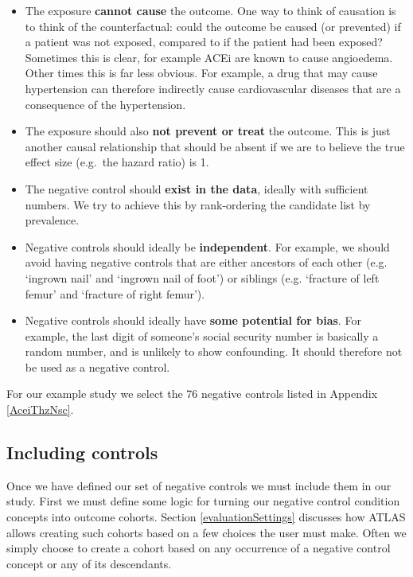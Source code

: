 \documentclass[11pt]{book}
\providecommand{\tightlist}{%
  \setlength{\itemsep}{0pt}\setlength{\parskip}{0pt}}
\begin{document}
\begin{itemize}
\tightlist
\item
  The exposure \textbf{cannot cause} the outcome. One way to think of
  causation is to think of the counterfactual: could the outcome be
  caused (or prevented) if a patient was not exposed, compared to if the
  patient had been exposed? Sometimes this is clear, for example ACEi
  are known to cause angioedema. Other times this is far less obvious.
  For example, a drug that may cause hypertension can therefore
  indirectly cause cardiovascular diseases that are a consequence of the
  hypertension.
\item
  The exposure should also \textbf{not prevent or treat} the outcome.
  This is just another causal relationship that should be absent if we
  are to believe the true effect size (e.g.~the hazard ratio) is 1.
\item
  The negative control should \textbf{exist in the data}, ideally with
  sufficient numbers. We try to achieve this by rank-ordering the
  candidate list by prevalence.
\item
  Negative controls should ideally be \textbf{independent}. For example,
  we should avoid having negative controls that are either ancestors of
  each other (e.g. `ingrown nail' and `ingrown nail of foot') or
  siblings (e.g. `fracture of left femur' and `fracture of right
  femur').
\item
  Negative controls should ideally have \textbf{some potential for
  bias}. For example, the last digit of someone's social security number
  is basically a random number, and is unlikely to show confounding. It
  should therefore not be used as a negative control.
\end{itemize}

For our example study we select the 76 negative controls listed in
Appendix \ref{AceiThzNsc}.

\subsection{Including controls}\label{including-controls}

Once we have defined our set of negative controls we must include them
in our study. First we must define some logic for turning our negative
control condition concepts into outcome cohorts. Section
\ref{evaluationSettings} discusses how ATLAS allows creating such
cohorts based on a few choices the user must make. Often we simply
choose to create a cohort based on any occurrence of a negative control
concept or any of its descendants.
\end{document}
